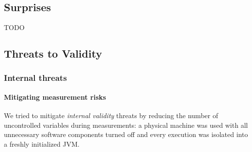 % 

 
 

\subsection{Surprises}
TODO

\subsection{Threats to Validity}

\subsubsection{Internal threats}

\paragraph{Mitigating measurement risks}
We tried to mitigate \emph{internal validity} threats by reducing the number of
uncontrolled variables during measurements: a physical machine was used with all
unnecessary software components turned off and every execution was isolated into
a freshly initialized JVM.


